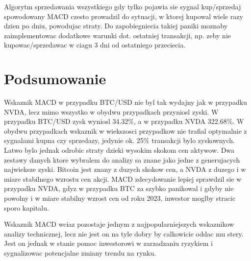 \documentclass[a4paper,12pt]{article}  %
\begin{document}
Algorytm sprzedawania wszystkiego gdy tylko pojawia sie sygnal kup/sprzedaj 
spowodowany MACD czesto prowadzil do sytuacji, w ktorej kupowal wiele razy dzien
po dniu, powodujac straty. Do zapobiegniecia takiej paniki moznaby
zaimplementowac dodatkowe warunki dot. ostatniej transakcji, np. zeby nie
kupowac/sprzedawac w ciagu 3 dni od ostatniego przeciecia.

\section{Podsumowanie}

Wskaznik MACD w przypadku BTC/USD nie byl tak wydajny jak w przypadku NVDA,
lecz mimo wszystko w obydwu przypadkach przyniosl zyski. W przypadku BTC/USD
zysk wyniosl 34.32\%, a w przypadku NVDA 322.68\%. W obydwu przypadkach
wskaznik w wiekszosci przypadkow nie trafial optymalnie z sygnalami kupna
czy sprzedazy, jedynie ok. 25\% transakcji bylo zyskownych. Latwo bylo jednak 
odrobic straty dzieki wysokim skokom cen aktywow. Dwa zestawy danych ktore
wybralem do analizy sa znane jako jedne z generujacych najwieksze zyski.
Bitcoin jest znany z duzych skokow cen, a NVDA z duzego i w miare stabilnego 
wzrostu cen akcji. MACD zdecydowanie lepiej sprawdzil sie w przypadku NVDA,
gdyz w przypadku BTC za szybko panikowal i gdyby nie powolny i w miare stabilny 
wzrost cen od roku 2023, inwestor moglby stracic sporo kapitalu.

Wskaznik MACD wciaz pozostaje jednym z najpopularniejszych wskaznikow analizy 
technicznej, lecz nie jest on na tyle dobry by calkowicie oddac mu stery.
Jest on jednak w stanie pomoc inwestorowi w zarzadzaniu ryzykiem i sygnalizowac
potencjalne zmiany trendu na rynku.


\printbibliography
\end{document}

